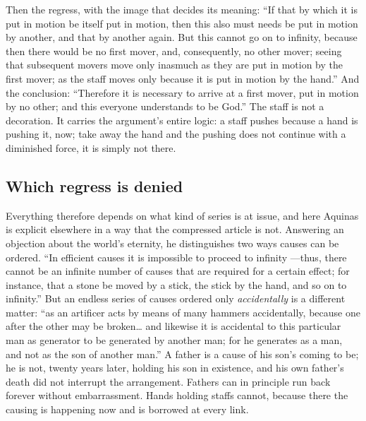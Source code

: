 Then the regress, with the image that decides its meaning: ``If that by which it is put in motion be itself put in motion, then this also must needs be put in motion by another, and that by another again. But this cannot go on to infinity, because then there would be no first mover, and, consequently, no other mover; seeing that subsequent movers move only inasmuch as they are put in motion by the first mover; as the staff moves only because it is put in motion by the hand.'' And the conclusion: ``Therefore it is necessary to arrive at a first mover, put in motion by no other; and this everyone understands to be God.'' The staff is not a decoration. It carries the argument's entire logic: a staff pushes because a hand is pushing it, now; take away the hand and the pushing does not continue with a diminished force, it is simply not there.

\subsection{Which regress is denied}

Everything therefore depends on what kind of series is at issue, and here Aquinas is explicit elsewhere in a way that the compressed article is not. Answering an objection about the world's eternity, he distinguishes two ways causes can be ordered. ``In efficient causes it is impossible to proceed to infinity ---thus, there cannot be an infinite number of causes that are  required for a certain effect; for instance, that a stone be moved by a stick, the stick by the hand, and so on to infinity.'' But an endless series of causes ordered only \emph{accidentally} is a different matter: ``as an artificer acts by means of many hammers accidentally, because one after the other may be broken\ldots{} and likewise it is accidental to this particular man as generator to be generated by another man; for he generates as a man, and not as the son of another man.'' A father is a cause of his son's coming to be; he is not, twenty years later, holding his son in existence, and his own father's death did not interrupt the arrangement. Fathers can in principle run back forever without embarrassment. Hands holding staffs cannot, because there the causing is happening now and is borrowed at every link.

